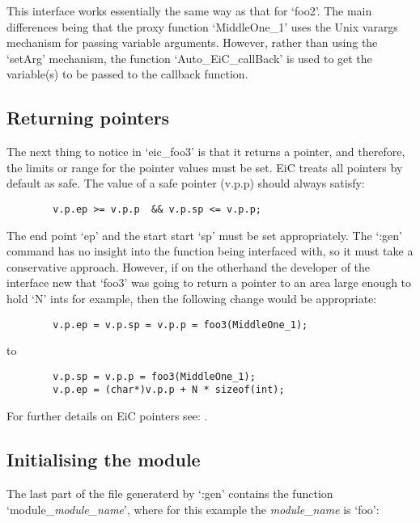 This interface works essentially the same way as that for `foo2'. The
main differences being that the proxy function `MiddleOne\_1' uses the
Unix varargs mechanism for passing variable arguments. However, rather
than using the `setArg' mechanism, the function `Auto\_EiC\_callBack'
is used to get the variable(s) to be passed to the callback function.


\subsection{Returning pointers}
\label{sec:return_pointer}


The next thing to notice in `eic\_foo3' is that it returns a pointer,
and therefore, the limits or range for the pointer values must be
set. EiC treats all pointers by default as safe. The value of a safe
pointer (v.p.p) should always satisfy:

\small
\begin{verbatim}
        v.p.ep >= v.p.p  && v.p.sp <= v.p.p;
\end{verbatim}
\normalsize

The end point `ep' and the start start `sp' must be set
appropriately. The `:gen' command has no insight into the function
being interfaced with, so it must take a conservative approach.
However, if on the otherhand the developer of the interface new that
`foo3' was going to return a pointer to an area large enough to hold
`N' ints for example, then the following change would be appropriate:

\small
\begin{verbatim}
        v.p.ep = v.p.sp = v.p.p = foo3(MiddleOne_1);
\end{verbatim}
\normalsize
to
\small
\begin{verbatim}
        v.p.sp = v.p.p = foo3(MiddleOne_1);
        v.p.ep = (char*)v.p.p + N * sizeof(int);
\end{verbatim}
\normalsize

For further details on EiC pointers see: .

\subsection{Initialising the module}
\label{sec:module_initialise}


The last part of the file generaterd by `:gen' contains the function
`module\_\textit{module\_name}', where for this example the
\textit{module\_name} is `foo':

